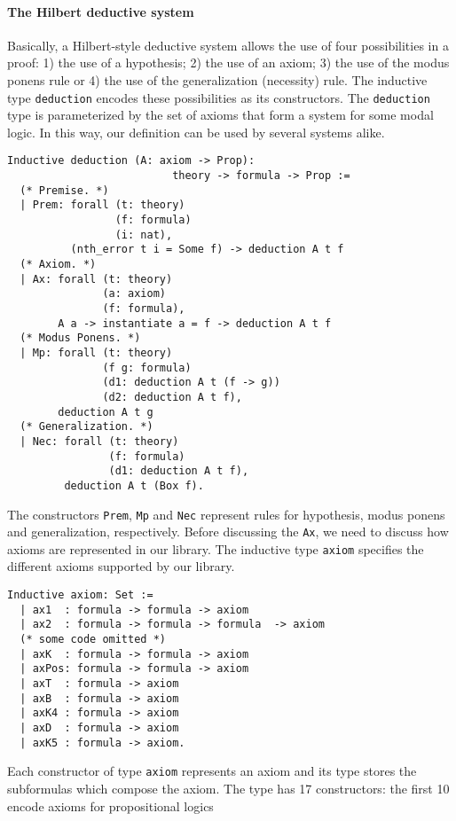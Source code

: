 \documentclass[sigconf]{acmart}
\begin{document}
\paragraph{The Hilbert deductive system}
Basically, a Hilbert-style deductive system allows the use of four
possibilities in a proof: 1) the use of a hypothesis; 2) the use of an axiom;
3) the use of the modus ponens rule or 4) the use of the generalization (necessity)
rule. The inductive type \texttt{deduction} encodes these possibilities
as its constructors. The \texttt{deduction} type is parameterized by
the set of axioms that form a system for some modal logic. In this way, our definition can be
used by several systems alike.
\begin{verbatim}
Inductive deduction (A: axiom -> Prop):
                          theory -> formula -> Prop :=
  (* Premise. *)
  | Prem: forall (t: theory)
                 (f: formula)
                 (i: nat),
          (nth_error t i = Some f) -> deduction A t f
  (* Axiom. *)
  | Ax: forall (t: theory)
               (a: axiom)
               (f: formula),
        A a -> instantiate a = f -> deduction A t f
  (* Modus Ponens. *)
  | Mp: forall (t: theory)
               (f g: formula)
               (d1: deduction A t (f -> g))
               (d2: deduction A t f),
        deduction A t g
  (* Generalization. *)
  | Nec: forall (t: theory)
                (f: formula)
                (d1: deduction A t f),
         deduction A t (Box f).
\end{verbatim}
The constructors \texttt{Prem}, \texttt{Mp} and \texttt{Nec}
represent rules for hypothesis, modus ponens and generalization, respectively.
Before discussing the \texttt{Ax}, we need to discuss how axioms are
represented in our library. The inductive type \texttt{axiom} specifies
the different axioms supported by our library.
\begin{verbatim}
Inductive axiom: Set :=
  | ax1  : formula -> formula -> axiom
  | ax2  : formula -> formula -> formula  -> axiom
  (* some code omitted *)
  | axK  : formula -> formula -> axiom
  | axPos: formula -> formula -> axiom
  | axT  : formula -> axiom
  | axB  : formula -> axiom
  | axK4 : formula -> axiom
  | axD  : formula -> axiom
  | axK5 : formula -> axiom.
\end{verbatim}
Each constructor of type \texttt{axiom} represents an axiom and
its type stores the subformulas which compose the axiom. The type has
17 constructors: the first 10 encode axioms for propositional logics
\end{document}
